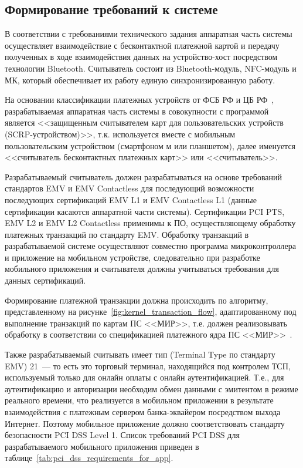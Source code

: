 

\subsection{Формирование требований к системе}

В соответствии с требованиями технического задания аппаратная часть системы осуществляет взаимодействие с бесконтактной платежной картой и передачу полученных в ходе взаимодействия данных на устройство-хост посредством технологии Bluetooth.
Считыватель состоит из Bluetooth-модуль, NFC-модуль и МК, который обеспечивает их работу единую синхронизированную работу.

На основании классификации платежных устройств от ФСБ РФ и ЦБ РФ~\cite{cbr_requirements}, разрабатываемая аппаратная часть системы в совокупности с программой является <<защищенным считывателем карт для пользовательских устройств (SCRP-устройством)>>, т.к. используется вместе с мобильным пользовательским устройством (смартфоном м или планшетом), далее именуется <<считыватель бесконтактных платежных карт>> или <<считыватель>>.

Разрабатываемый считыватель должен разрабатываться на основе требований стандартов EMV и EMV Contactless для последующий возможности последующих сертификаций EMV L1 и EMV Contactless L1 (данные сертификации касаются аппаратной части системы).
Сертификации PCI PTS, EMV L2 и EMV L2 Contactless применимы к ПО, осуществляющему обработку платежных транзакций по стандарту EMV.
Обработку транзакций в разрабатываемой системе осуществляют совместно программа микроконтроллера и приложение на мобильном устройстве, следовательно при разработке мобильного приложения и считывателя должны учитываться требования для данных сертификаций.

Формирование платежной транзакции должна происходить по алгоритму, представленному на рисунке~\ref{fig:kernel_transaction_flow}, адаптированному под выполнение транзакций по картам ПС <<МИР>>, т.е. должен реализовывать обработку в соответствии со спецификацией платежного ядра ПС <<МИР>>~\cite{book_mir}.

Также разрабатываемый считывать имеет тип (Terminal Type по стандарту EMV) 21~--- то есть это торговый терминал, находящийся под контролем ТСП, используемый только для онлайн оплаты с онлайн аутентификацией.
Т.е., для аутентификацию и авторизации необходим обмен данными с эмитентом в режиме реального времени, что реализуется в мобильном приложении  в результате взаимодействия с платежным сервером банка-эквайером посредством выхода Интернет.
Поэтому мобильное приложение должно соответствовать стандарту безопасности PCI DSS Level 1.
Список требований PCI DSS для разрабатываемого мобильного приложения приведен в таблице~\ref{tab:pci_dss_requirements_for_app}.

